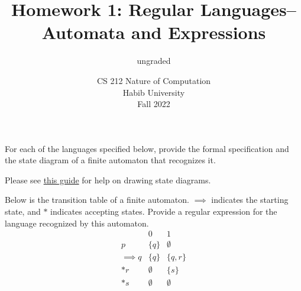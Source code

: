 \documentclass[addpoints]{exam}
\title{Homework 1: Regular Languages--Automata and Expressions}
\author{ungraded} %
\date{CS 212 Nature of Computation\\Habib University\\Fall 2022}
\begin{document}
\maketitle

\begin{questions}

\question For each of the languages specified below, provide the formal specification and the state diagram of a finite automaton that recognizes it. 

  Please see \href{https://www3.nd.edu/~kogge/courses/cse30151-fa17/Public/other/tikz_tutorial.pdf}{this guide} for help on drawing state diagrams.
  
\question[5] Below is the transition table of a finite automaton. $\implies$ indicates the starting state, and $*$ indicates accepting states. Provide a regular expression for the language recognized by this automaton.
  \[
  \begin{array}{r|cc}
    & 0 & 1 \\\hline
    p & \{ q \} & \emptyset \\
    \implies q & \{ q \} & \{ q, r \} \\
    *r & \emptyset & \{ s \} \\
    *s & \emptyset & \emptyset \\
  \end{array}
  \]
  
\question
\end{questions}
\end{document}
